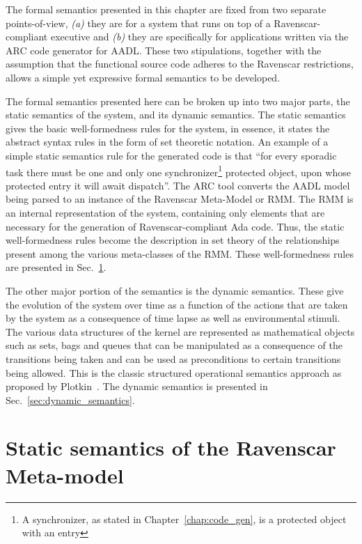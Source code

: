 The formal semantics presented in this chapter are fixed from two
separate points-of-view, \emph{(a)} they are for a system that runs on
top of a Ravenscar-compliant executive and \emph{(b)} they are
specifically for applications written via the ARC code generator for
AADL. These two stipulations, together with the assumption that the
functional source code adheres to the Ravenscar restrictions, allows a
simple yet expressive formal semantics to be developed.

The formal semantics presented here can be broken up into two major
parts, the static semantics of the system, and its dynamic
semantics. The static semantics gives the basic well-formedness rules
for the system, in essence, it states the abstract syntax rules in the
form of set theoretic notation. An example of a simple static
semantics rule for the generated code is that ``for every sporadic
task there must be one and only one synchronizer\footnote{A
  synchronizer, as stated in Chapter~\ref{chap:code_gen}, is a
  protected object with an entry} protected object, upon whose
protected entry it will await dispatch''. The ARC tool converts the
AADL model being parsed to an instance of the Ravenscar Meta-Model or
RMM. The RMM is an internal representation of the system, containing
only elements that are necessary for the generation of
Ravenscar-compliant Ada code. Thus, the static well-formedness rules
become the description in set theory of the relationships present
among the various meta-classes of the RMM. These well-formedness rules
are presented in Sec.~\ref{sec:static_semantics}.

The other major portion of the semantics is the dynamic
semantics. These give the evolution of the system over time as a
function of the actions that are taken by the system as a consequence
of time lapse as well as environmental stimuli. The various data
structures of the kernel are represented as mathematical objects such
as sets, bags and queues that can be manipulated as a consequence of
the transitions being taken and can be used as preconditions to
certain transitions being allowed. This is the classic structured
operational semantics approach as proposed by
Plotkin~\cite{plotkin-sos}. The dynamic semantics is presented in
Sec.~\ref{sec:dynamic_semantics}. 

\section{Static semantics of the Ravenscar Meta-model}
\label{sec:static_semantics}

